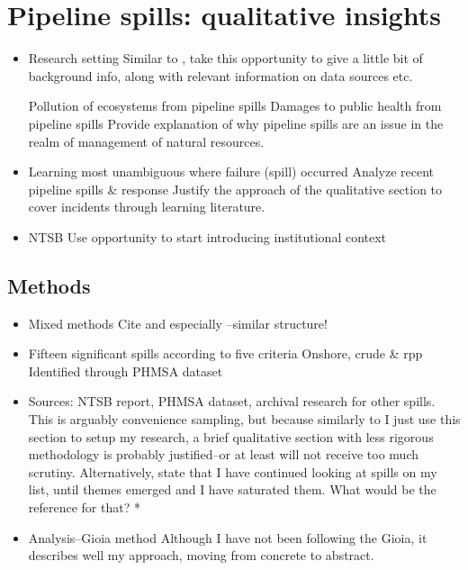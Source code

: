 	\section{Pipeline spills: qualitative insights}
	\begin{paracol}{2}
	\begin{itemize}
		\item Research setting
		\switchcolumn Similar to \citet{Howard-Grenville2017}, take this opportunity to give a little bit of background info, along with relevant information on data sources etc.
		\switchcolumn*
		
			\subitem Pollution of ecosystems from pipeline spills
			\subitem Damages to public health from pipeline spills
		\switchcolumn Provide explanation of why pipeline spills are an issue in the realm of management of natural resources. 
		\switchcolumn*
		
		\item Learning most unambiguous where failure (spill) occurred \citep{Madsen2010}
			\subitem Analyze recent pipeline spills \& response
		\switchcolumn Justify the approach of the qualitative section to cover incidents through learning literature.
		\switchcolumn*
		
		\item NTSB
			\switchcolumn Use opportunity to start introducing institutional context
			\switchcolumn*
	\end{itemize}
	\end{paracol}

	\subsection{Methods}
	\begin{paracol}{2}
	\begin{itemize}
		\item Mixed methods
		\switchcolumn Cite \citet{Montgomery2019} and especially \citet{Vergne2012}--similar structure!
		\switchcolumn*
		
		\item Fifteen significant spills according to five criteria
			\subitem Onshore, crude \& rpp
			\subitem Identified through PHMSA dataset
		\item Sources: NTSB report, PHMSA dataset, archival research for other spills.
		\switchcolumn This is arguably convenience sampling, but because similarly to \citet{Vergne2012} I just use this section to setup my research, a brief qualitative section with less rigorous methodology is probably justified--or at least will not receive too much scrutiny. Alternatively, state that I have continued looking at spills on my list, until themes emerged and I have saturated them. What would be the reference for that?
		\switchcolumn*
		\switchcolumn[0]*
		
		\item Analysis--Gioia method \citep{Gioia2013}
		\switchcolumn Although I have not been following the Gioia, it describes well my approach, moving from concrete to abstract.
		\switchcolumn*		
	\end{itemize}
	\end{paracol}
	
